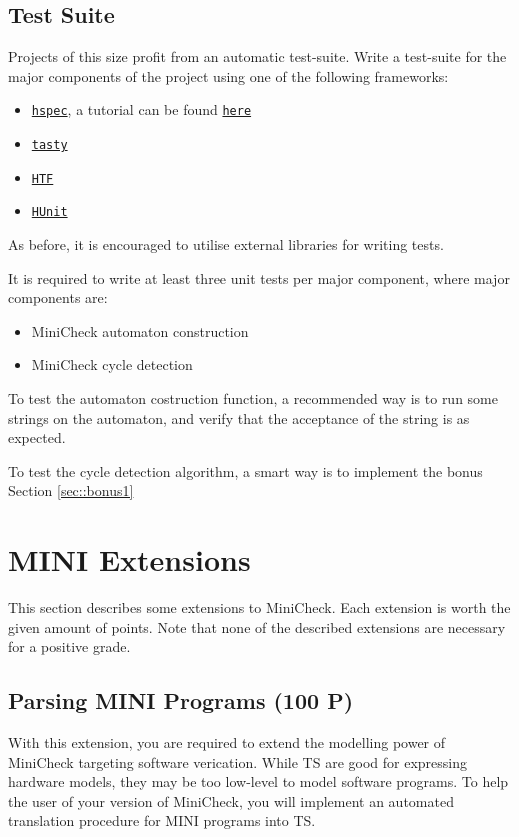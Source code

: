 \documentclass{article}
\begin{document}
\subsection{Test Suite}
Projects of this size profit from an automatic test-suite. 
Write a test-suite for the major components of the project using one of the following frameworks:

\begin{itemize}
\item \href{https://hackage.haskell.org/package/hspec}{\texttt{hspec}}, a tutorial can be found \href{https://hspec.github.io/}{\texttt{here}}
\item \href{https://hackage.haskell.org/package/tasty}{\texttt{tasty}}
\item \href{https://hackage.haskell.org/package/HTF}{\texttt{HTF}}
\item \href{https://hackage.haskell.org/package/HUnit}{\texttt{HUnit}}
\end{itemize}

As before, it is encouraged to utilise external libraries for writing tests.

It is required to write at least three unit tests per major component, where major components are:

\begin{itemize}
\item MiniCheck automaton construction
\item MiniCheck cycle detection
\end{itemize}

To test the automaton costruction function, a recommended way is to run some strings on the automaton, 
and verify that the acceptance of the string is as expected.

To test the cycle detection algorithm, a smart way is to implement the bonus Section \ref{sec::bonus1}

\section{MINI Extensions}
This section describes some extensions to MiniCheck. Each extension is worth the given amount of points. 
Note that none of the described extensions are necessary for a positive grade.

\subsection{Parsing MINI Programs (100 P)}
With this extension, you are required to extend the modelling power of MiniCheck targeting 
software verication. While TS are good for expressing hardware models, they may be too low-level 
to model software programs. To help the user of your version of MiniCheck, you will implement an 
automated translation procedure for MINI programs into TS.
\end{document}
